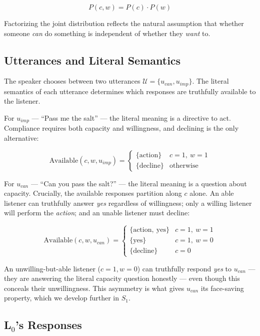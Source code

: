 \documentclass[12pt]{article}
\begin{document}
\[
P(c, w) = P(c) \cdot P(w)
\]

Factorizing the joint distribution reflects the natural assumption that whether someone \textit{can} do something is independent of whether they \textit{want} to.

\subsection{Utterances and Literal Semantics}

The speaker chooses between two utterances $\mathcal{U} = \{u_{can}, u_{imp}\}$. 
The literal semantics of each utterance determines which responses are truthfully available to the listener.

For $u_{imp}$ --- ``Pass me the salt'' --- the literal meaning is a directive to act. 
Compliance requires both capacity and willingness, and declining is the only alternative:

\[
\text{Available}(c, w, u_{imp}) = \begin{cases}
\{\text{action}\} & c = 1,\ w = 1 \\
\{\text{decline}\} & \text{otherwise}
\end{cases}
\]

For $u_{can}$ --- ``Can you pass the salt?'' --- the literal meaning is a question about capacity. Crucially, the available responses partition along $c$ alone. An able listener can truthfully answer \textit{yes} regardless of willingness; only a willing listener will perform the \textit{action}; and an unable listener must decline:

\[
\text{Available}(c, w, u_{can}) = \begin{cases}
\{\text{action},\ \text{yes}\} & c = 1,\ w = 1 \\
\{\text{yes}\} & c = 1,\ w = 0 \\
\{\text{decline}\} & c = 0
\end{cases}
\]

An unwilling-but-able listener ($c=1, w=0$) can truthfully respond \textit{yes} to $u_{can}$ --- they are answering the literal capacity question honestly --- even though this conceals their unwillingness.
This asymmetry is what gives $u_{can}$ its face-saving property, which we develop further in $S_1$.




\subsection{L$_0$'s Responses}
\end{document}

